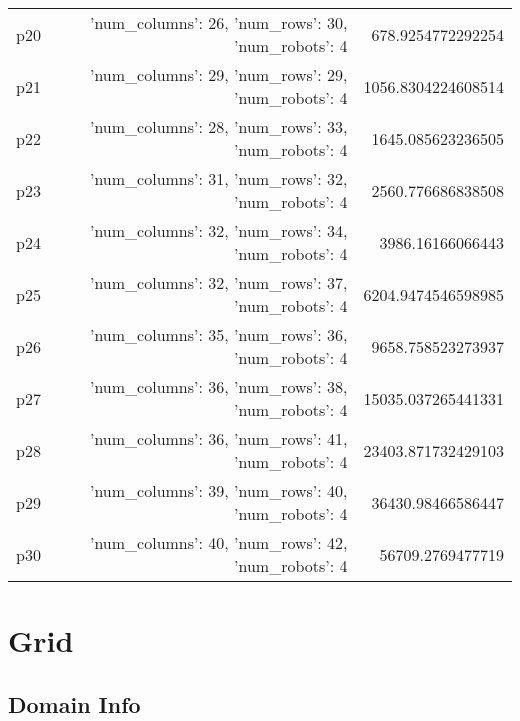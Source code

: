\documentclass{article}
\begin{document}
\begin{center}
\begin{tabular}{r|r|r}
  p20&{'num\_columns': 26, 'num\_rows': 30, 'num\_robots': 4}&678.9254772292254\\
  p21&{'num\_columns': 29, 'num\_rows': 29, 'num\_robots': 4}&1056.8304224608514\\
  p22&{'num\_columns': 28, 'num\_rows': 33, 'num\_robots': 4}&1645.085623236505\\
  p23&{'num\_columns': 31, 'num\_rows': 32, 'num\_robots': 4}&2560.776686838508\\
  p24&{'num\_columns': 32, 'num\_rows': 34, 'num\_robots': 4}&3986.16166066443\\
  p25&{'num\_columns': 32, 'num\_rows': 37, 'num\_robots': 4}&6204.9474546598985\\
  p26&{'num\_columns': 35, 'num\_rows': 36, 'num\_robots': 4}&9658.758523273937\\
  p27&{'num\_columns': 36, 'num\_rows': 38, 'num\_robots': 4}&15035.037265441331\\
  p28&{'num\_columns': 36, 'num\_rows': 41, 'num\_robots': 4}&23403.871732429103\\
  p29&{'num\_columns': 39, 'num\_rows': 40, 'num\_robots': 4}&36430.98466586447\\
  p30&{'num\_columns': 40, 'num\_rows': 42, 'num\_robots': 4}&56709.2769477719
                            \end{tabular}
                            \end{center}
                    
                            \newpage \section{Grid}
                    \subsection*{Domain Info}
\end{document}
